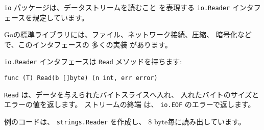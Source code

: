 \texttt{io} パッケージは、データストリームを読むこと
を表現する \texttt{io.Reader} インタフェースを規定しています。

Goの標準ライブラリには、ファイル、ネットワーク接続、圧縮、
暗号化などで、このインタフェースの 多くの実装 があります。

\texttt{io.Reader} インタフェースは \texttt{Read} メソッドを持ちます:

\begin{lstlisting}[numbers=none]
func (T) Read(b []byte) (n int, err error)
\end{lstlisting}

\texttt{Read} は、データを与えられたバイトスライスへ入れ、
入れたバイトのサイズとエラーの値を返します。 ストリームの終端
は、 \texttt{io.EOF} のエラーで返します。

例のコードは、 \texttt{strings.Reader} を作成し、
8 byte毎に読み出しています。